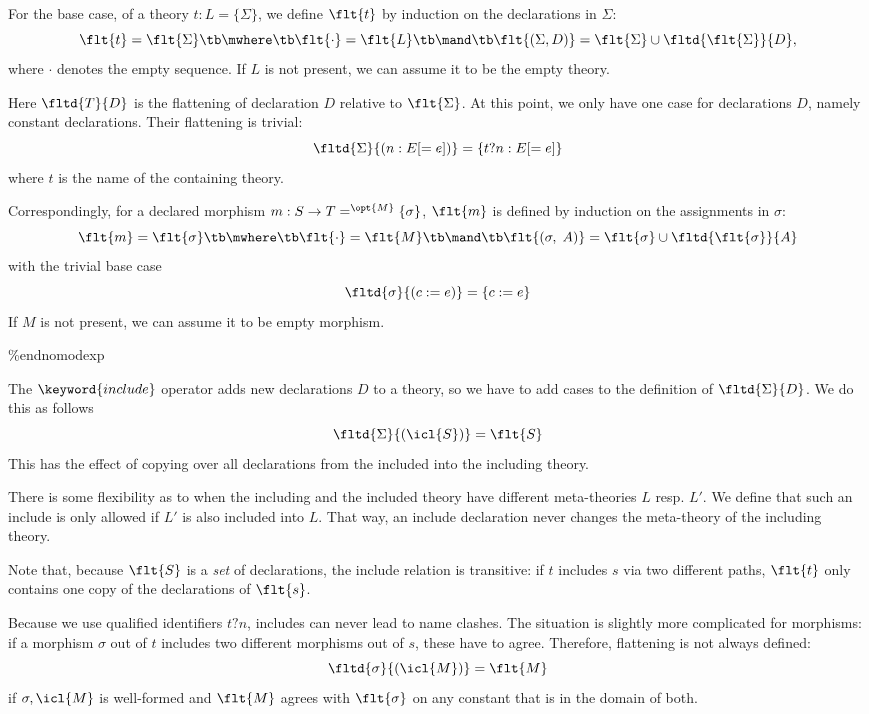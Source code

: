 \begin{definition}[Flattening]
For the base case, of a theory $t:L=\{\Sigma\}$, we define $\flt{t}$ by induction on the declarations in $\Sigma$:
\[\flt{t}=\flt{\Sigma} \tb\mwhere\tb \flt{\cdot}=\flt{L} \tb\mand\tb
 \flt{(\Sigma,D)}=\flt{\Sigma}\cup\fltd{\flt{\Sigma}}{D},\]
 where $\cdot$ denotes the empty sequence.
 If $L$ is not present, we can assume it to be the empty theory.
 
Here $\fltd{T}{D}$ is the flattening of declaration $D$ relative to $\flt{\Sigma}$.
At this point, we only have one case for declarations $D$, namely constant declarations.
Their flattening is trivial:
 \[\fltd{\Sigma}{(n:E[=e])}=\{t?n:E[=e]\}\]
where $t$ is the name of the containing theory.

Correspondingly, for a declared morphism $m:S\to T=^{\opt{M}}\{\sigma\}$, $\flt{m}$ is defined by induction on the assignments in $\sigma$:
\[\flt{m}=\flt{\sigma} \tb\mwhere\tb \flt{\cdot}=\flt{M} \tb\mand\tb\flt{(\sigma,\;A)}=\flt{\sigma}\cup\fltd{\flt{\sigma}}{A}\]
with the trivial base case
 \[\fltd{\sigma}{(c:=e)}=\{c:=e\}\]
If $M$ is not present, we can assume it to be empty morphism.
 
\%end{nomodexp}
\end{definition}

\begin{example}\label{sem:incl}
The $\keyword{include}$ operator adds new declarations $D$ to a theory, so we have to add cases to the definition of $\fltd{\Sigma}{D}$.
We do this as follows
  \[\fltd{\Sigma}{(\icl{S})} = \flt{S}\]
This has the effect of copying over all declarations from the included into the including theory.

There is some flexibility as to when the including and the included theory have different meta-theories $L$ resp. $L'$.
We define that such an include is only allowed if $L'$ is also included into $L$.
That way, an include declaration never changes the meta-theory of the including theory.

Note that, because $\flt{S}$ is a \textit{set} of declarations, the include relation is transitive: if $t$ includes $s$ via two different paths, $\flt{t}$ only contains one copy of the declarations of $\flt{s}$.

Because we use qualified identifiers $t?n$, includes can never lead to name clashes.
The situation is slightly more complicated for morphisms: if a morphism $\sigma$ out of $t$ includes two different morphisms out of $s$, these have to agree.
Therefore, flattening is not always defined:
  \[\fltd{\sigma}{(\icl{M})} = \flt{M}\]
if $\sigma,\icl{M}$ is well-formed and $\flt{M}$ agrees with $\flt{\sigma}$ on any constant that is in the domain of both.
\end{example}

